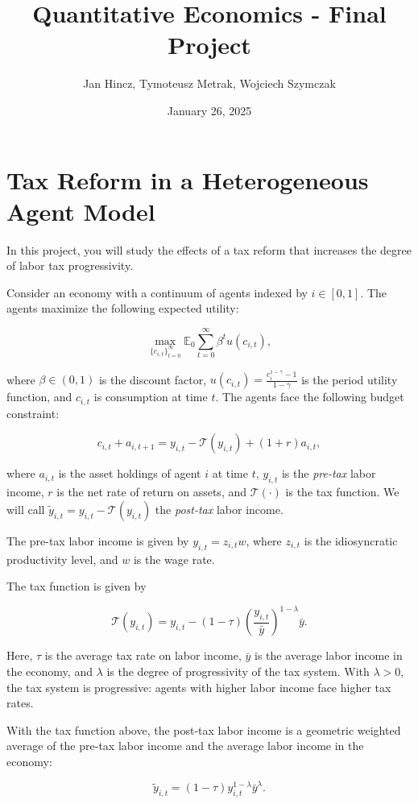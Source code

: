 \documentclass{article}
\title{Quantitative Economics - Final Project}
\author{Jan Hincz, Tymoteusz Metrak, Wojciech Szymczak}
\date{January 26, 2025}
\begin{document}
\maketitle


\section*{Tax Reform in a Heterogeneous Agent Model}
In this project, you will study the effects of a tax reform that increases the degree of labor tax progressivity.

Consider an economy with a continuum of agents indexed by \(i \in [0,1]\). The agents maximize the following expected utility:

\[
\max_{\{c_{i,t}\}_{t=0}^{\infty}} \mathbb{E}_{0} \sum_{t=0}^{\infty} \beta^{t} u(c_{i,t}),
\]

where \(\beta \in (0,1)\) is the discount factor, \(u(c_{i,t}) = \frac{c_{i}^{1-\gamma} - 1}{1 - \gamma}\) is the period utility function, and \(c_{i,t}\) is consumption at time \(t\). The agents face the following budget constraint:

\[
c_{i,t} + a_{i,t+1} = y_{i,t} - \mathcal{T}(y_{i,t}) + (1 + r) a_{i,t},
\]

where \(a_{i,t}\) is the asset holdings of agent \(i\) at time \(t\), \(y_{i,t}\) is the \textit{pre-tax} labor income, \(r\) is the net rate of return on assets, and \(\mathcal{T}(\cdot)\) is the tax function. We will call \(\tilde{y}_{i,t} = y_{i,t} - \mathcal{T}(y_{i,t})\) the \textit{post-tax} labor income.

The pre-tax labor income is given by \(y_{i,t} = z_{i,t} w\), where \(z_{i,t}\) is the idiosyncratic productivity level, and \(w\) is the wage rate.

The tax function is given by

\[
\mathcal{T}(y_{i,t}) = y_{i,t} - (1 - \tau) \left( \frac{y_{i,t}}{\bar{y}} \right)^{1 - \lambda} \bar{y}.
\]

Here, \(\tau\) is the average tax rate on labor income, \(\bar{y}\) is the average labor income in the economy, and \(\lambda\) is the degree of progressivity of the tax system. With \(\lambda > 0\), the tax system is progressive: agents with higher labor income face higher tax rates.

With the tax function above, the post-tax labor income is a geometric weighted average of the pre-tax labor income and the average labor income in the economy:

\[
\tilde{y}_{i,t} = (1 - \tau) y_{i,t}^{1 - \lambda} \bar{y}^{\lambda}.
\]
\end{document}
